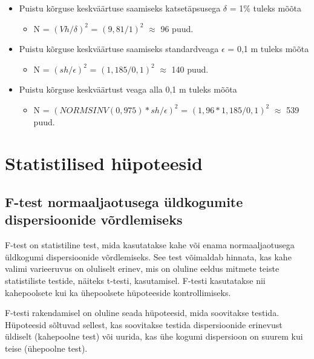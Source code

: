 \documentclass[
]{book}
\providecommand{\tightlist}{%
  \setlength{\itemsep}{0pt}\setlength{\parskip}{0pt}}
\theoremstyle{definition}
\theoremstyle{definition}
\theoremstyle{definition}
\theoremstyle{definition}
\theoremstyle{remark}
\begin{document}
\begin{itemize}
\tightlist
\item
  Puistu kõrguse keskväärtuse saamiseks katsetäpsusega \(\delta\) = 1\% tuleks mõõta

  \begin{itemize}
  \tightlist
  \item
    N = \((Vh/\delta)^2\) = \((9,81/1)^2\) \(\approx\) 96 puud.
  \end{itemize}
\item
  Puistu kõrguse keskväärtuse saamiseks standardveaga \(\epsilon\) = 0,1 m tuleks mõõta

  \begin{itemize}
  \tightlist
  \item
    N = \((sh/\epsilon)^2\) = \((1,185/0,1)^2\) \(\approx\) 140 puud.
  \end{itemize}
\item
  Puistu kõrguse keskväärtust veaga alla 0,1 m tuleks mõõta

  \begin{itemize}
  \tightlist
  \item
    N = \((NORMSINV(0,975)*sh/\epsilon)^2\) = \((1,96 * 1,185/0,1)^2\) \(\approx\) 539 puud.
  \end{itemize}
\end{itemize}

\section{Statistilised hüpoteesid}\label{statistilised-huxfcpoteesid}

\subsection{F-test normaaljaotusega üldkogumite dispersioonide võrdlemiseks}\label{f-test-normaaljaotusega-uxfcldkogumite-dispersioonide-vuxf5rdlemiseks}

F-test on statistiline test, mida kasutatakse kahe või enama normaaljaotusega üldkogumi dispersioonide võrdlemiseks. See test võimaldab hinnata, kas kahe valimi varieeruvus on oluliselt erinev, mis on oluline eeldus mitmete teiste statistiliste testide, näiteks t-testi, kasutamisel. F-testi kasutatakse nii kahepoolsete kui ka ühepoolsete hüpoteeside kontrollimiseks.

F-testi rakendamisel on oluline seada hüpoteesid, mida soovitakse testida. Hüpoteesid sõltuvad sellest, kas soovitakse testida dispersioonide erinevust üldiselt (kahepoolne test) või uurida, kas ühe kogumi dispersioon on suurem kui teise (ühepoolne test).
\end{document}
